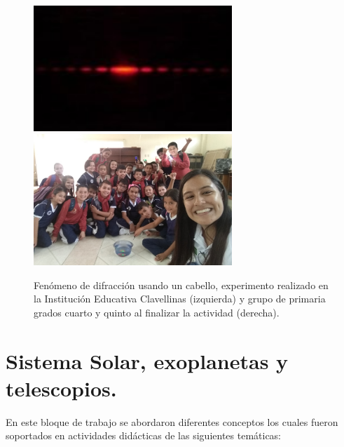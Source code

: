 \documentclass[a4paper,10pt]{article}
\begin{document}
\begin{figure}[H]
    \centering
    \includegraphics[width=7.5cm]{Imagenes/cabello.jpg}
    \includegraphics[width=7.5cm]{Imagenes/sanluis.jpg}
    \caption{Fenómeno de difracción usando un cabello, experimento realizado en la Institución Educativa Clavellinas (izquierda) y grupo de primaria grados cuarto y quinto al finalizar la actividad (derecha).}
\end{figure}

\section{Sistema Solar, exoplanetas y telescopios.}

\noindent En este bloque de trabajo se abordaron diferentes conceptos  los cuales fueron soportados en actividades didácticas de las siguientes temáticas:
\end{document}
